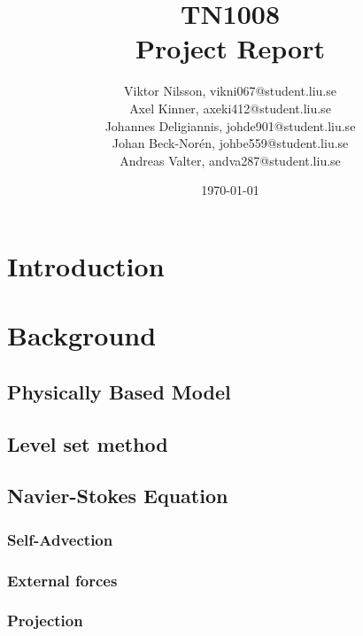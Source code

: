 \documentclass[]{report}   %
\begin{document}
\title{TN1008\\ Project Report}   %
\author{
  Viktor Nilsson, vikni067@student.liu.se 
  \\Axel Kinner, axeki412@student.liu.se
  \\Johannes Deligiannis, johde901@student.liu.se
  \\Johan Beck-Norén, johbe559@student.liu.se
  \\Andreas Valter, andva287@student.liu.se
	}
        \date{\today}    %
        \maketitle
        
\setcounter{page}{2}



\begingroup
\let\clearpage\relax %
\chapter{Introduction}


\chapter{Background}
\section{Physically Based Model}

\section{Level set method}

\section{Navier-Stokes Equation}

\subsection{Self-Advection}

\subsection{External forces}

\subsection{Projection}

\end{document}
